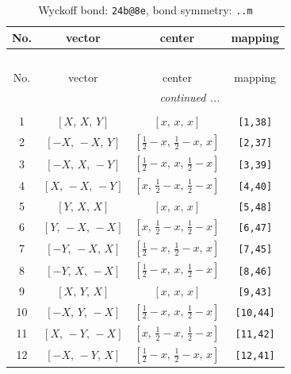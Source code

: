 \documentclass[fleqn,8pt]{jsarticle}
\begin{document}
\begin{longtable}{cccc}
\caption{Wyckoff bond: {\tt 24b@8e}, bond symmetry: {\tt ..m}}
 \\
 \hline \hline
No. & vector & center & mapping \\ \hline \endfirsthead

\multicolumn{3}{l}{\tablename\ \thetable{}} \\
 \hline \hline
No. & vector & center & mapping \\ \hline \endhead

 \hline \hline
\multicolumn{3}{r}{\footnotesize\it continued ...} \\ \endfoot

 \hline \hline
\multicolumn{3}{r}{} \\ \endlastfoot

1 & $\left[ X,\, X,\, Y \right]$ & $\left[ x,\, x,\, x \right]$ & {\tt [1,38]} \\ \hline
2 & $\left[ - X,\, - X,\, Y \right]$ & $\left[ \frac{1}{2} - x,\, \frac{1}{2} - x,\, x \right]$ & {\tt [2,37]} \\ \hline
3 & $\left[ - X,\, X,\, - Y \right]$ & $\left[ \frac{1}{2} - x,\, x,\, \frac{1}{2} - x \right]$ & {\tt [3,39]} \\ \hline
4 & $\left[ X,\, - X,\, - Y \right]$ & $\left[ x,\, \frac{1}{2} - x,\, \frac{1}{2} - x \right]$ & {\tt [4,40]} \\ \hline
5 & $\left[ Y,\, X,\, X \right]$ & $\left[ x,\, x,\, x \right]$ & {\tt [5,48]} \\ \hline
6 & $\left[ Y,\, - X,\, - X \right]$ & $\left[ x,\, \frac{1}{2} - x,\, \frac{1}{2} - x \right]$ & {\tt [6,47]} \\ \hline
7 & $\left[ - Y,\, - X,\, X \right]$ & $\left[ \frac{1}{2} - x,\, \frac{1}{2} - x,\, x \right]$ & {\tt [7,45]} \\ \hline
8 & $\left[ - Y,\, X,\, - X \right]$ & $\left[ \frac{1}{2} - x,\, x,\, \frac{1}{2} - x \right]$ & {\tt [8,46]} \\ \hline
9 & $\left[ X,\, Y,\, X \right]$ & $\left[ x,\, x,\, x \right]$ & {\tt [9,43]} \\ \hline
10 & $\left[ - X,\, Y,\, - X \right]$ & $\left[ \frac{1}{2} - x,\, x,\, \frac{1}{2} - x \right]$ & {\tt [10,44]} \\ \hline
11 & $\left[ X,\, - Y,\, - X \right]$ & $\left[ x,\, \frac{1}{2} - x,\, \frac{1}{2} - x \right]$ & {\tt [11,42]} \\ \hline
12 & $\left[ - X,\, - Y,\, X \right]$ & $\left[ \frac{1}{2} - x,\, \frac{1}{2} - x,\, x \right]$ & {\tt [12,41]} \\ \hline

\end{longtable}
\end{document}

